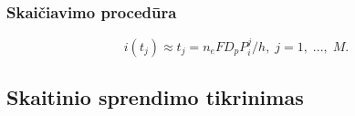 \documentclass[12pt, a4paper, lithuanian]{article}
\begin{document}
% 
% 
% 
% 
\subsubsection{Skaičiavimo procedūra}

\begin{equation} 
    i(t_j) \approx t_j = n_eFD_pP_i^j/h,\; j=1,\;...,\;M. 
\end{equation}

\subsection{Skaitinio sprendimo tikrinimas}
% 
% 
\end{document}
